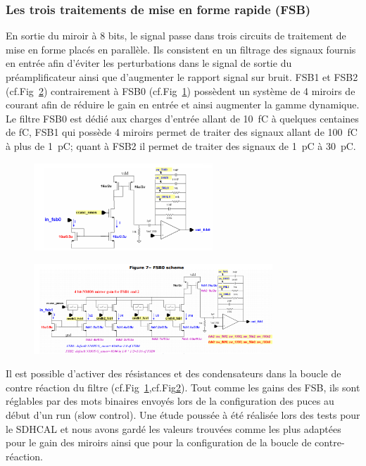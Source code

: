 \subsubsection{Les trois traitements de mise en forme rapide (FSB)}
En sortie du miroir à \num{8} bits, le signal passe dans trois circuits de traitement de mise en forme placés en parallèle. Ils consistent en un filtrage des signaux fournis en entrée afin d'éviter les perturbations dans le signal de sortie du préamplificateur ainsi que d'augmenter le rapport signal sur bruit. FSB1 et FSB2 (cf.Fig~\ref{fsb1}) contrairement à FSB0 (cf.Fig~\ref{fsb0}) possèdent un système de \num{4} miroirs de courant afin de réduire le gain en entrée et ainsi augmenter la gamme dynamique. Le filtre FSB0 est dédié aux charges d'entrée allant de \SI{10}{\femto\coulomb} à quelques centaines de \si{\femto\coulomb}, FSB1 qui possède \num{4} miroirs permet de traiter des signaux allant de \SI{100}{\femto\coulomb} à plus de \SI{1}{\pico\coulomb}; quant à FSB2 il permet de traiter des signaux de \SI{1}{\pico\coulomb} à \SI{30}{\pico\coulomb}.

\begin{figure}[ht!]
	\centering
	\includegraphics[width=0.60\textwidth]{GLA/FSB0.png}
	\label{fsb0}
\end{figure}

\begin{figure}[ht!]
	\centering
	\includegraphics[width=0.8\textwidth]{GLA/FSB1.png}
	\label{fsb1}
\end{figure}

Il est possible d'activer des résistances et des condensateurs dans la boucle de contre réaction du filtre (cf.Fig~\ref{fsb0},cf.Fig\ref{fsb1}). Tout comme les gains des FSB, ils sont réglables par des mots binaires envoyés lors de la configuration des puces au début d'un run (slow control). Une étude poussée à été réalisée lors des tests pour le SDHCAL et nous avons gardé les valeurs trouvées comme les plus adaptées pour le gain des miroirs ainsi que pour la configuration de la boucle de contre-réaction.


